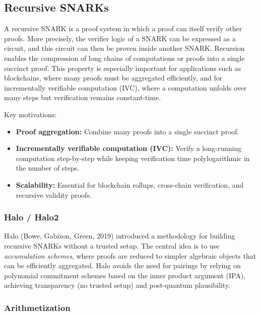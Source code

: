 \subsection{Recursive SNARKs}

A recursive SNARK is a proof system in which a proof can itself verify other proofs. More precisely, the verifier logic of a SNARK can be expressed as a circuit, and this circuit can then be proven inside another SNARK. Recursion enables the compression of long chains of computations or proofs into a single succinct proof. This property is especially important for applications such as blockchains, where many proofs must be aggregated efficiently, and for incrementally verifiable computation (IVC), where a computation unfolds over many steps but verification remains constant-time.

Key motivations:
\begin{itemize}
    \item \textbf{Proof aggregation:} Combine many proofs into a single succinct proof.
    \item \textbf{Incrementally verifiable computation (IVC):} Verify a long-running computation step-by-step while keeping verification time polylogarithmic in the number of steps.
    \item \textbf{Scalability:} Essential for blockchain rollups, cross-chain verification, and recursive validity proofs.
\end{itemize}

\subsubsection{Halo / Halo2}

Halo (Bowe, Gabizon, Green, 2019) introduced a methodology for building recursive SNARKs without a trusted setup. The central idea is to use \emph{accumulation schemes}, where proofs are reduced to simpler algebraic objects that can be efficiently aggregated. Halo avoids the need for pairings by relying on polynomial commitment schemes based on the inner product argument (IPA), achieving transparency (no trusted setup) and post-quantum plausibility.

\subsubsection*{Arithmetization}


